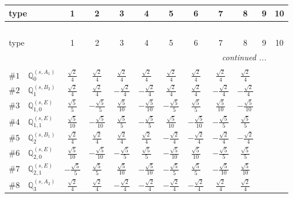 \documentclass[fleqn,9pt,landscape]{jsarticle}
\begin{document}
\begin{center}
\renewcommand{\arraystretch}{1.3}
\begin{longtable}{lcccccccccc}
 \hline \hline
type & 1 & 2 & 3 & 4 & 5 & 6 & 7 & 8 & 9 & 10 \\ \hline \endfirsthead

\multicolumn{10}{l}{\tablename\ \thetable{}} \\
 \hline \hline
type & 1 & 2 & 3 & 4 & 5 & 6 & 7 & 8 & 9 & 10 \\ \hline \endhead

 \hline \hline
\multicolumn{10}{r}{\footnotesize\it continued ...} \\ \endfoot

 \hline \hline
\multicolumn{10}{r}{} \\ \endlastfoot

$ \#1\quad \mathbb{Q}_{0}^{(s,A_{1})} $ & $ \frac{\sqrt{2}}{4} $ & $ \frac{\sqrt{2}}{4} $ & $ \frac{\sqrt{2}}{4} $ & $ \frac{\sqrt{2}}{4} $ & $ \frac{\sqrt{2}}{4} $ & $ \frac{\sqrt{2}}{4} $ & $ \frac{\sqrt{2}}{4} $ & $ \frac{\sqrt{2}}{4} $ \\ \hline
$ \#2\quad \mathbb{Q}_{1}^{(s,B_{2})} $ & $ \frac{\sqrt{2}}{4} $ & $ \frac{\sqrt{2}}{4} $ & $ - \frac{\sqrt{2}}{4} $ & $ - \frac{\sqrt{2}}{4} $ & $ \frac{\sqrt{2}}{4} $ & $ \frac{\sqrt{2}}{4} $ & $ - \frac{\sqrt{2}}{4} $ & $ - \frac{\sqrt{2}}{4} $ \\ \hline
$ \#3\quad \mathbb{Q}_{1,0}^{(s,E)} $ & $ \frac{\sqrt{5}}{5} $ & $ - \frac{\sqrt{5}}{5} $ & $ \frac{\sqrt{5}}{10} $ & $ - \frac{\sqrt{5}}{10} $ & $ - \frac{\sqrt{5}}{5} $ & $ \frac{\sqrt{5}}{5} $ & $ \frac{\sqrt{5}}{10} $ & $ - \frac{\sqrt{5}}{10} $ \\ \hline
$ \#4\quad \mathbb{Q}_{1,1}^{(s,E)} $ & $ \frac{\sqrt{5}}{10} $ & $ - \frac{\sqrt{5}}{10} $ & $ \frac{\sqrt{5}}{5} $ & $ - \frac{\sqrt{5}}{5} $ & $ \frac{\sqrt{5}}{10} $ & $ - \frac{\sqrt{5}}{10} $ & $ - \frac{\sqrt{5}}{5} $ & $ \frac{\sqrt{5}}{5} $ \\ \hline
$ \#5\quad \mathbb{Q}_{2}^{(s,B_{1})} $ & $ \frac{\sqrt{2}}{4} $ & $ \frac{\sqrt{2}}{4} $ & $ \frac{\sqrt{2}}{4} $ & $ \frac{\sqrt{2}}{4} $ & $ - \frac{\sqrt{2}}{4} $ & $ - \frac{\sqrt{2}}{4} $ & $ - \frac{\sqrt{2}}{4} $ & $ - \frac{\sqrt{2}}{4} $ \\ \hline
$ \#6\quad \mathbb{Q}_{2,0}^{(s,E)} $ & $ \frac{\sqrt{5}}{10} $ & $ - \frac{\sqrt{5}}{10} $ & $ - \frac{\sqrt{5}}{5} $ & $ \frac{\sqrt{5}}{5} $ & $ - \frac{\sqrt{5}}{10} $ & $ \frac{\sqrt{5}}{10} $ & $ - \frac{\sqrt{5}}{5} $ & $ \frac{\sqrt{5}}{5} $ \\ \hline
$ \#7\quad \mathbb{Q}_{2,1}^{(s,E)} $ & $ - \frac{\sqrt{5}}{5} $ & $ \frac{\sqrt{5}}{5} $ & $ \frac{\sqrt{5}}{10} $ & $ - \frac{\sqrt{5}}{10} $ & $ - \frac{\sqrt{5}}{5} $ & $ \frac{\sqrt{5}}{5} $ & $ - \frac{\sqrt{5}}{10} $ & $ \frac{\sqrt{5}}{10} $ \\ \hline
$ \#8\quad \mathbb{Q}_{3}^{(s,A_{2})} $ & $ \frac{\sqrt{2}}{4} $ & $ \frac{\sqrt{2}}{4} $ & $ - \frac{\sqrt{2}}{4} $ & $ - \frac{\sqrt{2}}{4} $ & $ - \frac{\sqrt{2}}{4} $ & $ - \frac{\sqrt{2}}{4} $ & $ \frac{\sqrt{2}}{4} $ & $ \frac{\sqrt{2}}{4} $ \\
\end{longtable}
\end{center}
\end{document}
